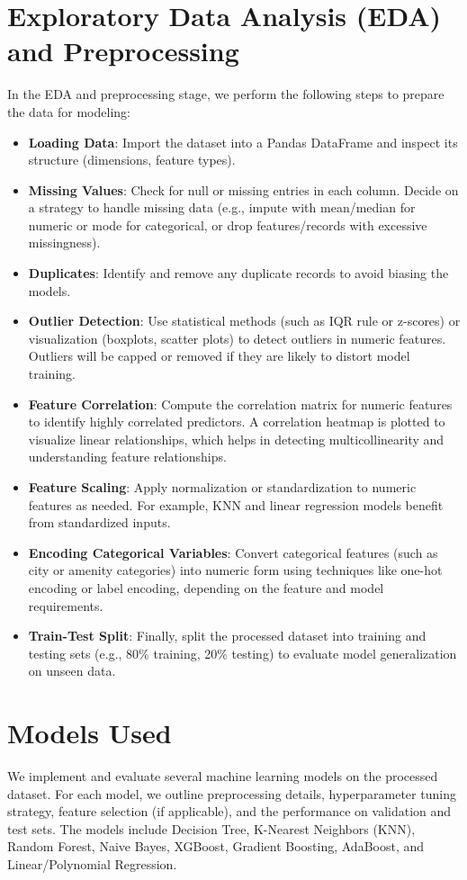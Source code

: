 \documentclass[12pt]{article}
\begin{document}
\section{Exploratory Data Analysis (EDA) and Preprocessing}
In the EDA and preprocessing stage, we perform the following steps to prepare the data for modeling:
\begin{itemize}
    \item \textbf{Loading Data}: Import the dataset into a Pandas DataFrame and inspect its structure (dimensions, feature types).
    \item \textbf{Missing Values}: Check for null or missing entries in each column. Decide on a strategy to handle missing data (e.g., impute with mean/median for numeric or mode for categorical, or drop features/records with excessive missingness).
    \item \textbf{Duplicates}: Identify and remove any duplicate records to avoid biasing the models.
    \item \textbf{Outlier Detection}: Use statistical methods (such as IQR rule or z-scores) or visualization (boxplots, scatter plots) to detect outliers in numeric features. Outliers will be capped or removed if they are likely to distort model training.
    \item \textbf{Feature Correlation}: Compute the correlation matrix for numeric features to identify highly correlated predictors. A correlation heatmap is plotted to visualize linear relationships, which helps in detecting multicollinearity and understanding feature relationships.
    \item \textbf{Feature Scaling}: Apply normalization or standardization to numeric features as needed. For example, KNN and linear regression models benefit from standardized inputs.
    \item \textbf{Encoding Categorical Variables}: Convert categorical features (such as city or amenity categories) into numeric form using techniques like one-hot encoding or label encoding, depending on the feature and model requirements.
    \item \textbf{Train-Test Split}: Finally, split the processed dataset into training and testing sets (e.g., 80\% training, 20\% testing) to evaluate model generalization on unseen data.
\end{itemize}


\section{Models Used}
We implement and evaluate several machine learning models on the processed dataset. For each model, we outline preprocessing details, hyperparameter tuning strategy, feature selection (if applicable), and the performance on validation and test sets. The models include Decision Tree, K-Nearest Neighbors (KNN), Random Forest, Naive Bayes, XGBoost, Gradient Boosting, AdaBoost, and Linear/Polynomial Regression.
\end{document}
